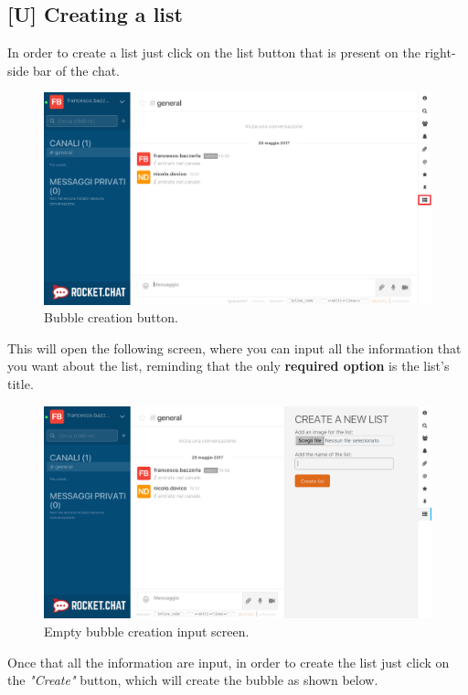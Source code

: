 \newpage
\subsection{[U] Creating a list}
In order to create a list just click on the list button that is present on the right-side bar of the chat.

\begin{figure}[H]
  \centering 
  \includegraphics[width=\textwidth]{Sections/3-HowToUse/Images/button_list_create.png}
  \caption{Bubble creation button.}
\end{figure}

This will open the following screen, where you can input all the information that you want about the list, reminding that the only \textbf{required option} is the list's title.

\begin{figure}[H]
  \centering 
  \includegraphics[width=\textwidth]{Sections/3-HowToUse/Images/list_create.png}
  \caption{Empty bubble creation input screen.}
\end{figure}

Once that all the information are input, in order to create the list just click on the \textit{"Create"} button, which will create the bubble as shown below.

